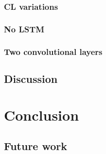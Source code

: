         \subsubsection{CL variations}
        
        \subsubsection{No LSTM}
        
        \subsubsection{Two convolutional layers}
        
    \subsection{Discussion}
    
% 
% 
\section{\label{chap:conclusion}Conclusion}

    \subsection{Future work}
    
